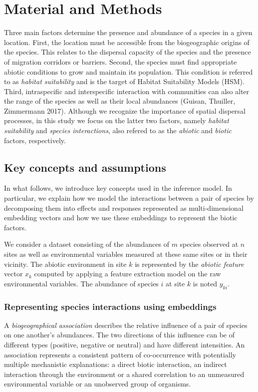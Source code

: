 \documentclass[]{article}
\newcommand{\spc}{i}
\newcommand{\site}{k}
\newcommand{\abiov}{x}
\newcommand{\abdv}{y}
\begin{document}
\section{Material and Methods}
Three main factors determine the presence and abundance of a species
in a given location.  First, the location must be accessible from the
biogeographic origins of the species. This relates to the dispersal
capacity of the species and the presence of migration corridors or
barriers.  Second, the species must find appropriate abiotic
conditions to grow and maintain its population. This condition is
referred to as \textit{habitat suitability} and is the target of
Habitat Suitability Models (HSM). Third, intraspecific and
interspecific interaction with communities can also alter the range of
the species as well as their local abundances (Guisan, Thuiller,
Zimmermann 2017). Although we recognize the importance of spatial dispersal processes,
in this study we focus on the latter two factors, namely \emph{habitat suitability} and \emph{species interactions}, also refered to as the \emph{abiotic} and \emph{biotic} factors, respectively.


\subsection{Key concepts and assumptions}
In what follows, we introduce key concepts used in the inference model.
In particular, we explain how we model the interactions between a pair of species by decomposing them into effects and responses represented as multi-dimensional embedding vectors and how we use these embeddings to represent the biotic factors.

We consider a dataset consisting of the abundances of $m$ species observed at $n$ sites as well as environmental variables measured at these same sites or in their vicinity.
The abiotic environment in site $\site$ is represented by the \emph{abiotic feature} vector $\abiov_{\site}$ computed by applying a feature extraction model on the raw environmental variables.
The abundance of species $\spc$ at site $\site$ is noted $\abdv_{\site\spc}$. 

\subsubsection{Representing species interactions using embeddings}
A \textit{biogeographical association} describes the relative
influence of a pair of species on one another's abundances.  The two
directions of this influence can be of different types (positive,
negative or neutral) and have different intensities.  An association
represents a consistent pattern of co-occurrence with potentially
multiple mechanistic explanations: a direct biotic interaction, an indirect
interaction through the environment or a shared correlation to an
unmeasured environmental variable or an unobserved group of organisms.
\end{document}
